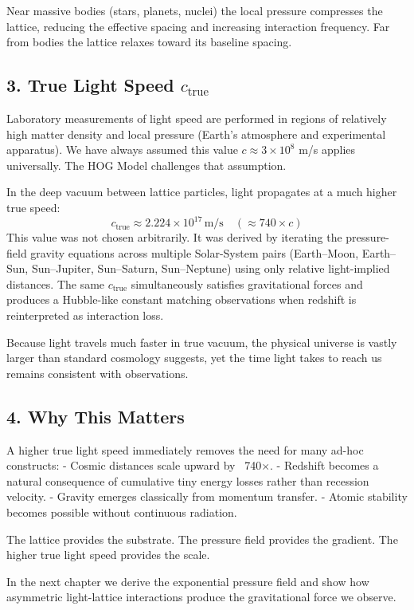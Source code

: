 \documentclass[11pt,a4paper]{book}
\begin{document}
Near massive bodies (stars, planets, nuclei) the local pressure compresses the lattice, reducing the effective spacing and increasing interaction frequency. Far from bodies the lattice relaxes toward its baseline spacing.

\subsection{3. True Light Speed \( c_{\text{true}} \)}
Laboratory measurements of light speed are performed in regions of relatively high matter density and local pressure (Earth’s atmosphere and experimental apparatus). We have always assumed this value \( c \approx 3 \times 10^8 \) m/s applies universally. The HOG Model challenges that assumption.

In the deep vacuum between lattice particles, light propagates at a much higher true speed:
\[
c_{\text{true}} \approx 2.224 \times 10^{17} \, \text{m/s} \quad (\approx 740 \times c)
\]
This value was not chosen arbitrarily. It was derived by iterating the pressure-field gravity equations across multiple Solar-System pairs (Earth–Moon, Earth–Sun, Sun–Jupiter, Sun–Saturn, Sun–Neptune) using only relative light-implied distances. The same \( c_{\text{true}} \) simultaneously satisfies gravitational forces and produces a Hubble-like constant matching observations when redshift is reinterpreted as interaction loss.

Because light travels much faster in true vacuum, the physical universe is vastly larger than standard cosmology suggests, yet the time light takes to reach us remains consistent with observations.

\subsection{4. Why This Matters}
A higher true light speed immediately removes the need for many ad-hoc constructs:
- Cosmic distances scale upward by ~740×.
- Redshift becomes a natural consequence of cumulative tiny energy losses rather than recession velocity.
- Gravity emerges classically from momentum transfer.
- Atomic stability becomes possible without continuous radiation.

The lattice provides the substrate. The pressure field provides the gradient. The higher true light speed provides the scale.

In the next chapter we derive the exponential pressure field and show how asymmetric light-lattice interactions produce the gravitational force we observe.
\end{document}
